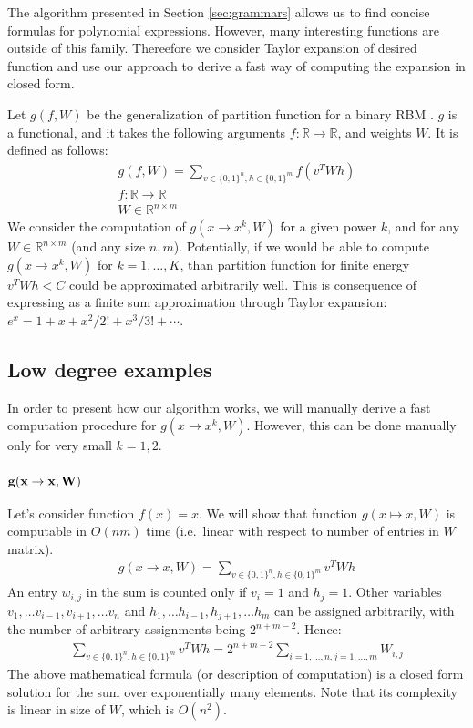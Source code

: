 The algorithm presented in Section
\ref{sec:grammars} allows us to find concise formulas for polynomial expressions.
However, many interesting functions are outside of this
family. Thereefore we consider Taylor expansion of desired function
and use our approach to derive a fast way of computing the expansion
in closed form.

Let $g(f, W)$ be the generalization of partition function for a binary
RBM \cite{hinton2002training}. 
$g$ is a functional, and it takes the following arguments $f : \mathbb{R} \rightarrow \mathbb{R}$,
and weights $W$. It is defined as follows: 
\begin{gather*}
g(f, W) = \sum_{v \in \{0, 1\}^n, h \in \{0, 1\}^m} f(v^TWh) \\
f : \mathbb{R} \rightarrow \mathbb{R}\\
W \in \mathbb{R}^{n \times m}
\end{gather*}
We consider the computation of $g(x \rightarrow x^k, W)$ for a given power
$k$, and for any $W
\in \mathbb{R}^{n \times m}$ (and any size $n, m$). Potentially, if we would be able
to compute $g(x \rightarrow x^k, W)$ for $k = 1, \dots, K$, than partition
function for finite energy $v^TWh < C$ could be approximated arbitrarily well.
This is consequence of expressing as a finite sum approximation through
Taylor expansion: $e^{x}=1+x+x^2/2!+x^3/3!+\cdots$.

\subsection{Low degree examples} In order to present how our algorithm works,
we will manually derive a fast computation procedure for $g(x \rightarrow x^k, W)$.
However, this can be done manually only for very small $k = 1, 2$. 


\subsubsection{{$\bf g(x \rightarrow x, W)$}} Let's consider function $f(x) = x$. We
will show that function $g(x \mapsto x, W)$ is computable in $O(nm)$ time
(i.e.~linear with respect to number of entries in $W$ matrix).
\begin{gather*}
	g(x \rightarrow x, W) = \sum_{v \in \{0, 1\}^n, h \in \{0, 1\}^m} v^TWh
\end{gather*}
An entry $w_{i,j}$ in the sum is counted only if $v_i = 1$ and $h_j = 1$. Other variables
$v_1, \dots v_{i-1}, v_{i+1}, \dots v_n$ and $h_1, \dots h_{i-1}, h_{j+1}, \dots h_m$ can be 
assigned arbitrarily, with the number of arbitrary assignments being
$2^{n + m - 2}$. Hence:
\begin{gather*}
	\sum_{v \in \{0, 1\}^n, h \in \{0, 1\}^m} v^TWh = 2^{n + m - 2}\sum_{i = 1, \dots, n, j = 1, \dots, m} W_{i, j}
\end{gather*}
The above mathematical formula (or description of computation) is a
closed form solution for the sum over exponentially many
elements. Note that its complexity is linear in size of $W$, which is $O(n^2)$.

